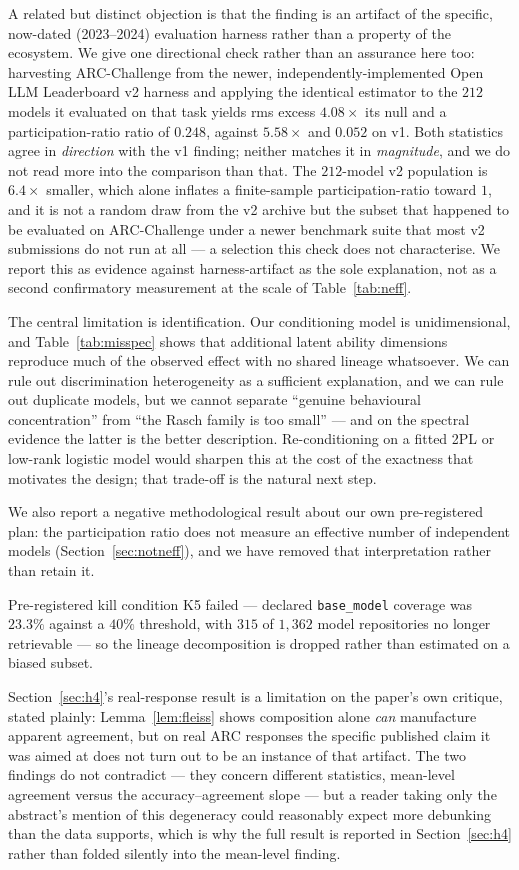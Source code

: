 \documentclass[pdflatex,sn-mathphys-ay]{sn-jnl}
\theoremstyle{thmstyleone}
\theoremstyle{thmstylethree}
\begin{document}
A related but distinct objection is that the finding is an artifact of the specific,
now-dated (2023--2024) evaluation harness rather than a property of the ecosystem. We give one
directional check rather than an assurance here too: harvesting ARC-Challenge from the newer,
independently-implemented Open LLM Leaderboard v2 harness and applying the identical estimator to
the $212$ models it evaluated on that task yields rms excess $4.08\times$ its null and a
participation-ratio ratio of $0.248$, against $5.58\times$ and $0.052$ on v1. Both statistics agree
in \emph{direction} with the v1 finding; neither matches it in \emph{magnitude}, and we do not
read more into the comparison than that. The $212$-model v2 population is $6.4\times$ smaller,
which alone inflates a finite-sample participation-ratio toward $1$, and it is not a random draw
from the v2 archive but the subset that happened to be evaluated on ARC-Challenge under a newer
benchmark suite that most v2 submissions do not run at all --- a selection this check does not
characterise. We report this as evidence against harness-artifact as the sole explanation, not as
a second confirmatory measurement at the scale of Table~\ref{tab:neff}.

The central limitation is identification. Our conditioning model is unidimensional, and
Table~\ref{tab:misspec} shows that additional latent ability dimensions reproduce much of the
observed effect with no shared lineage whatsoever. We can rule out discrimination heterogeneity
as a sufficient explanation, and we can rule out duplicate models, but we cannot separate
``genuine behavioural concentration'' from ``the Rasch family is too small'' --- and on the
spectral evidence the latter is the better description. Re-conditioning on a fitted 2PL or
low-rank logistic model would sharpen this at the cost of the exactness that motivates the
design; that trade-off is the natural next step.

We also report a negative methodological result about our own pre-registered plan: the
participation ratio does not measure an effective number of independent models
(Section~\ref{sec:notneff}), and we have removed that interpretation rather than retain it.

Pre-registered kill condition K5 failed --- declared \texttt{base\_model} coverage was $23.3\%$
against a $40\%$ threshold, with $315$ of $1{,}362$ model repositories no longer retrievable ---
so the lineage decomposition is dropped rather than estimated on a biased subset.

Section~\ref{sec:h4}'s real-response result is a limitation on the paper's own critique, stated
plainly: Lemma~\ref{lem:fleiss} shows composition alone \emph{can} manufacture apparent
agreement, but on real ARC responses the specific published claim it was aimed at does not turn
out to be an instance of that artifact. The two findings do not contradict --- they concern
different statistics, mean-level agreement versus the accuracy--agreement slope --- but a reader
taking only the abstract's mention of this degeneracy could reasonably expect more debunking than
the data supports, which is why the full result is reported in Section~\ref{sec:h4} rather than
folded silently into the mean-level finding.
\end{document}
